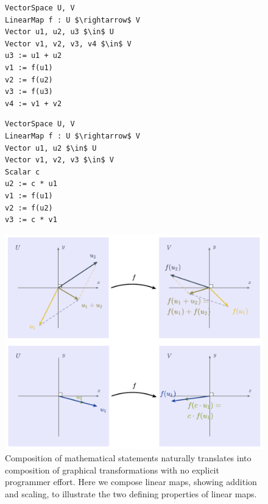 \begin{figure}
  \begin{minipage}[t]{0.45\columnwidth}
   \begin{mdframed}[style=SUBCode]
    \begin{lstlisting}[language=Sub-LA,escapechar=@,numbers=none]
VectorSpace U, V
LinearMap f : U $\rightarrow$ V
Vector u1, u2, u3 $\in$ U
Vector v1, v2, v3, v4 $\in$ V
u3 := u1 + u2
v1 := f(u1)
v2 := f(u2)
v3 := f(u3)
v4 := v1 + v2
\end{lstlisting}
   \end{mdframed}
\end{minipage}\hfill
  \begin{minipage}[t]{0.45\columnwidth}
   \begin{mdframed}[style=SUBCode]
    \begin{lstlisting}[language=Sub-LA,escapechar=@,numbers=none]
VectorSpace U, V
LinearMap f : U $\rightarrow$ V
Vector u1, u2 $\in$ U
Vector v1, v2, v3 $\in$ V
Scalar c
u2 := c * u1
v1 := f(u1)
v2 := f(u2)
v3 := c * v1 \end{lstlisting}
   \end{mdframed}
  \end{minipage}
\includegraphics[width=\columnwidth]{assets/penrose/linearmap-add-scale.pdf}
   \caption{Composition of mathematical statements naturally translates into composition of graphical transformations with no explicit programmer effort.  Here we compose linear maps, showing addition and scaling, to illustrate the two defining properties of linear maps.\label{fig:linearMap}}
\end{figure}


